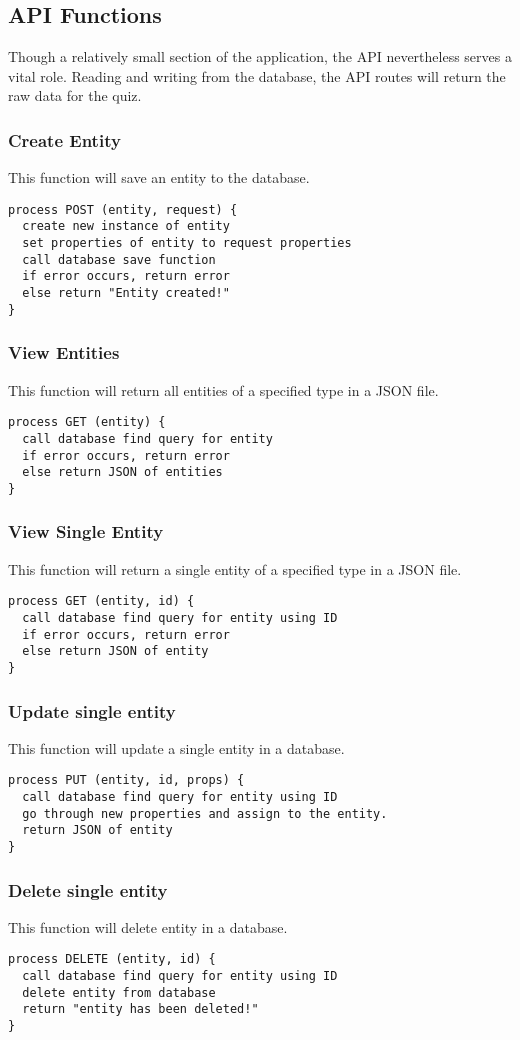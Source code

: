 \subsection{API Functions}
Though a relatively small section of the application, the API nevertheless serves a vital role. Reading and writing from the database, the API routes will return the raw data for the quiz.

\subsubsection{Create Entity}
This function will save an entity to the database.
\begin{verbatim}
process POST (entity, request) {
  create new instance of entity
  set properties of entity to request properties
  call database save function
  if error occurs, return error
  else return "Entity created!"
}
\end{verbatim}

\subsubsection{View Entities}
This function will return all entities of a specified type in a JSON file.
\begin{verbatim}
process GET (entity) {
  call database find query for entity
  if error occurs, return error
  else return JSON of entities
}
\end{verbatim}

\subsubsection{View Single Entity}
This function will return a single entity of a specified type in a JSON file.
\begin{verbatim}
process GET (entity, id) {
  call database find query for entity using ID
  if error occurs, return error
  else return JSON of entity
}
\end{verbatim}

\subsubsection{Update single entity}
This function will update a single entity in a database.
\begin{verbatim}
process PUT (entity, id, props) {
  call database find query for entity using ID
  go through new properties and assign to the entity.
  return JSON of entity
}
\end{verbatim}

\subsubsection{Delete single entity}
This function will delete entity in a database.
\begin{verbatim}
process DELETE (entity, id) {
  call database find query for entity using ID
  delete entity from database
  return "entity has been deleted!"
}
\end{verbatim}
